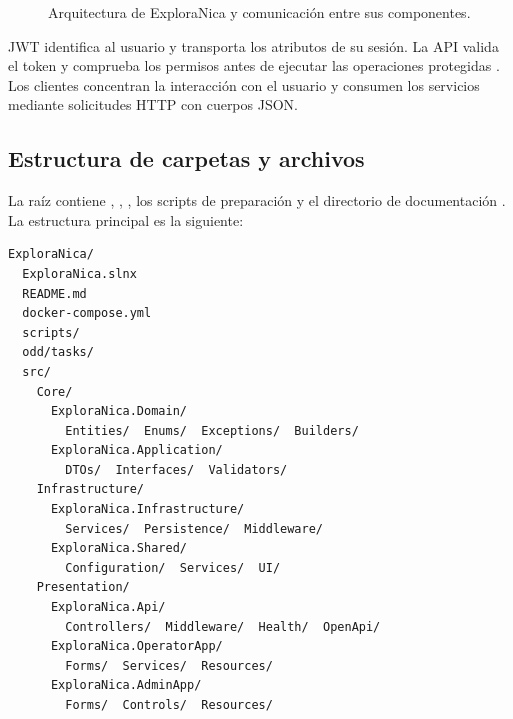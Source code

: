 \begin{figure}[htbp]
\centering
{}
\caption{Arquitectura de ExploraNica y comunicación entre sus componentes.}
\label{fig:arquitectura-real}
\end{figure}

JWT identifica al usuario y transporta los atributos de su sesión. La API valida el token y comprueba los permisos antes de ejecutar las operaciones protegidas \cite{ref20}. Los clientes concentran la interacción con el usuario y consumen los servicios mediante solicitudes HTTP con cuerpos JSON.

\clearpage
\subsection{Estructura de carpetas y archivos}
La raíz contiene , , , los scripts de preparación y el directorio de documentación . La estructura principal es la siguiente:
\begin{Verbatim}[fontsize=\small]
ExploraNica/
  ExploraNica.slnx
  README.md
  docker-compose.yml
  scripts/
  odd/tasks/
  src/
    Core/
      ExploraNica.Domain/
        Entities/  Enums/  Exceptions/  Builders/
      ExploraNica.Application/
        DTOs/  Interfaces/  Validators/
    Infrastructure/
      ExploraNica.Infrastructure/
        Services/  Persistence/  Middleware/
      ExploraNica.Shared/
        Configuration/  Services/  UI/
    Presentation/
      ExploraNica.Api/
        Controllers/  Middleware/  Health/  OpenApi/
      ExploraNica.OperatorApp/
        Forms/  Services/  Resources/
      ExploraNica.AdminApp/
        Forms/  Controls/  Resources/
\end{Verbatim}

